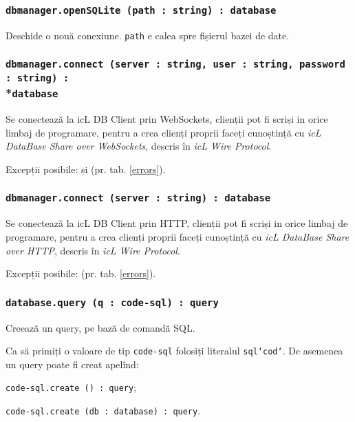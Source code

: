 \subsubsection{\texttt{dbmanager.openSQLite (path : string) : database}}

Deschide o nouă conexiune. \texttt{path} e calea spre fișierul bazei de date.

\subsubsection{\texttt{dbmanager.connect (server : string, user : string, password : string) :}\\*\texttt{database}}

Se conectează la icL DB Client prin WebSockets, clienții pot fi scriși in orice limbaj de programare, pentru a crea clienți proprii faceți cunoștință cu \textit{icL DataBase Share over WebSockets}, descris în \textit{icL Wire Protocol}.

Excepții posibile:  și  (pr. tab. \ref{errors}).

\subsubsection{\texttt{dbmanager.connect (server : string) : database}}

Se conectează la icL DB Client prin HTTP, clienții pot fi scriși in orice limbaj de programare, pentru a crea clienți proprii faceți cunoștință cu \textit{icL DataBase Share over HTTP}, descris în \textit{icL Wire Protocol}.

Excepții posibile:  (pr. tab. \ref{errors}).

\subsubsection{\texttt{database.query (q : code-sql) : query}}

Creează un query, pe bază de comandă SQL.

Ca să primiți o valoare de tip \texttt{code-sql} folosiți literalul \texttt{sql{`cod`}}. De asemenea un query poate fi creat apelînd:
\begin{icItems}
\item \texttt{code-sql.create () : query};
\item \texttt{code-sql.create (db : database) : query}.
\end{icItems}

